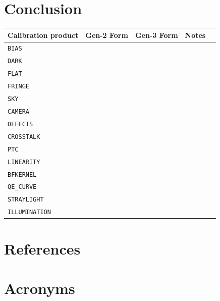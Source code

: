 \documentclass[DM,authoryear,toc]{lsstdoc}
\begin{document}
\section{Conclusion}



\appendix

\begin{tabular}{l |c|c|l|l}
  Calibration product & Gen-2 Form & Gen-3 Form & Notes \\
  \hline
  \verb|BIAS| & & & \\
  \verb|DARK| & & & \\
  \verb|FLAT| & & & \\
  \verb|FRINGE| & & & \\
  \verb|SKY| & & & \\
  \verb|CAMERA| & & & \\
  \verb|DEFECTS| & & & \\
  \verb|CROSSTALK| & & & \\
  \verb|PTC| & & & \\
  \verb|LINEARITY| & & & \\
  \verb|BFKERNEL| & & & \\
  \verb|QE_CURVE| & & & \\
  \verb|STRAYLIGHT| & & & \\
  \verb|ILLUMINATION| & & & \\
\end{tabular}

\section{References} \label{sec:bib}


\section{Acronyms} \label{sec:acronyms}

\end{document}
